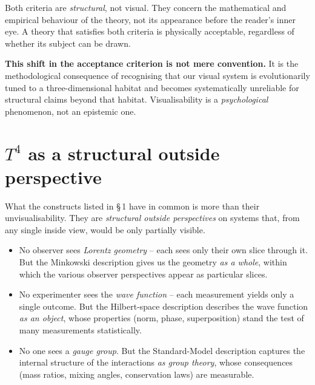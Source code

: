 Both criteria are \emph{structural}, not visual. They concern the
mathematical and empirical behaviour of the theory, not its
appearance before the reader's inner eye. A theory that satisfies
both criteria is physically acceptable, regardless of whether its
subject can be drawn.

\textbf{This shift in the acceptance criterion is not mere
convention.} It is the methodological consequence of recognising
that our visual system is evolutionarily tuned to a three-dimensional
habitat and becomes systematically unreliable for structural claims
beyond that habitat. Visualisability is a \emph{psychological}
phenomenon, not an epistemic one.

\section{$T^4$ as a structural outside perspective}

What the constructs listed in §\,1 have in common is more than their
unvisualisability. They are \emph{structural outside perspectives} on
systems that, from any single inside view, would be only partially
visible.

\begin{itemize}[leftmargin=2em,itemsep=4pt,topsep=4pt]
  \item No observer sees \emph{Lorentz geometry} -- each sees only
        their own slice through it. But the Minkowski description
        gives us the geometry \emph{as a whole}, within which the
        various observer perspectives appear as particular slices.

  \item No experimenter sees the \emph{wave function} -- each
        measurement yields only a single outcome. But the
        Hilbert-space description describes the wave function \emph{as
        an object}, whose properties (norm, phase, superposition)
        stand the test of many measurements statistically.

  \item No one sees a \emph{gauge group}. But the Standard-Model
        description captures the internal structure of the
        interactions \emph{as group theory}, whose consequences
        (mass ratios, mixing angles, conservation laws) are
        measurable.
\end{itemize}

